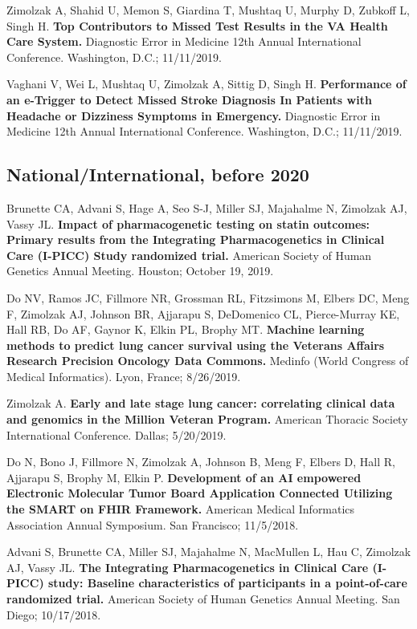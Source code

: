 \documentclass[10pt]{article}
\begin{document}

Zimolzak A, Shahid U, Memon S, Giardina T, Mushtaq U, Murphy D,
Zubkoff L, Singh H. \textbf{Top Contributors to Missed Test Results in
  the VA Health Care System.} Diagnostic Error in Medicine 12th Annual
International Conference. Washington, D.C.; 11/11/2019.

Vaghani V, Wei L, Mushtaq U, Zimolzak A, Sittig D, Singh H.
\textbf{Performance of an e-Trigger to Detect Missed Stroke Diagnosis
  In Patients with Headache or Dizziness Symptoms in Emergency.}
Diagnostic Error in Medicine 12th Annual International Conference.
Washington, D.C.; 11/11/2019.


\subsection{National/International, before 2020}

Brunette CA, Advani S, Hage A, Seo S-J, Miller SJ, Majahalme N,
Zimolzak AJ, Vassy JL. \textbf{Impact of pharmacogenetic testing on
  statin outcomes: Primary results from the Integrating
  Pharmacogenetics in Clinical Care (I-PICC) Study randomized trial.}
American Society of Human Genetics Annual Meeting. Houston; October
19, 2019.

Do NV, Ramos JC, Fillmore NR, Grossman RL, Fitzsimons M, Elbers DC,
Meng F, Zimolzak AJ, Johnson BR, Ajjarapu S, DeDomenico CL,
Pierce-Murray KE, Hall RB, Do AF, Gaynor K, Elkin PL, Brophy MT.
\textbf{Machine learning methods to predict lung cancer survival using
  the Veterans Affairs Research Precision Oncology Data Commons.}
Medinfo (World Congress of Medical Informatics). Lyon, France;
8/26/2019.

Zimolzak A. \textbf{Early and late stage lung cancer: correlating
  clinical data and genomics in the Million Veteran Program.} American
Thoracic Society International Conference. Dallas; 5/20/2019.

Do N, Bono J, Fillmore N, Zimolzak A, Johnson B, Meng F, Elbers D,
Hall R, Ajjarapu S, Brophy M, Elkin P. \textbf{Development of an AI
  empowered Electronic Molecular Tumor Board Application Connected
  Utilizing the SMART on FHIR Framework.} American Medical Informatics
Association Annual Symposium. San Francisco; 11/5/2018.

Advani S, Brunette CA, Miller SJ, Majahalme N, MacMullen L, Hau C,
Zimolzak AJ, Vassy JL. \textbf{The Integrating Pharmacogenetics in
  Clinical Care (I-PICC) study: Baseline characteristics of
  participants in a point-of-care randomized trial.} American Society
of Human Genetics Annual Meeting. San Diego; 10/17/2018.
\end{document}
